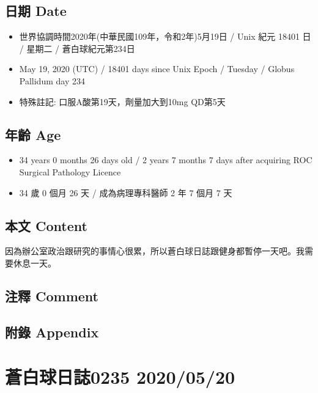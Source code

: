 \documentclass[a5paper, 12pt
]{book}
\providecommand{\tightlist}{%
  \setlength{\itemsep}{0pt}\setlength{\parskip}{0pt}}
\begin{document}
\hypertarget{ux65e5ux671f-date-79}{%
\subsection{日期 Date}\label{ux65e5ux671f-date-79}}

\begin{itemize}
\tightlist
\item
  世界協調時間2020年(中華民國109年，令和2年)5月19日 / Unix 紀元 18401 日
  / 星期二 / 蒼白球紀元第234日
\item
  May 19, 2020 (UTC) / 18401 days since Unix Epoch / Tuesday / Globus
  Pallidum day 234
\item
  特殊註記: 口服A酸第19天，劑量加大到10mg QD第5天
\end{itemize}

\hypertarget{ux5e74ux9f61-age-79}{%
\subsection{年齡 Age}\label{ux5e74ux9f61-age-79}}

\begin{itemize}
\tightlist
\item
  34 years 0 months 26 days old / 2 years 7 months 7 days after
  acquiring ROC Surgical Pathology Licence
\item
  34 歲 0 個月 26 天 / 成為病理專科醫師 2 年 7 個月 7 天
\end{itemize}

\hypertarget{ux672cux6587-content-79}{%
\subsection{本文 Content}\label{ux672cux6587-content-79}}

因為辦公室政治跟研究的事情心很累，所以蒼白球日誌跟健身都暫停一天吧。我需要休息一天。

\hypertarget{ux6ce8ux91cb-comment-79}{%
\subsection{注釋 Comment}\label{ux6ce8ux91cb-comment-79}}

\hypertarget{ux9644ux9304-appendix-79}{%
\subsection{附錄 Appendix}\label{ux9644ux9304-appendix-79}}

\hypertarget{ux84bcux767dux7403ux65e5ux8a8c0235-20200520}{%
\section{蒼白球日誌0235
2020/05/20}\label{ux84bcux767dux7403ux65e5ux8a8c0235-20200520}}
\end{document}
